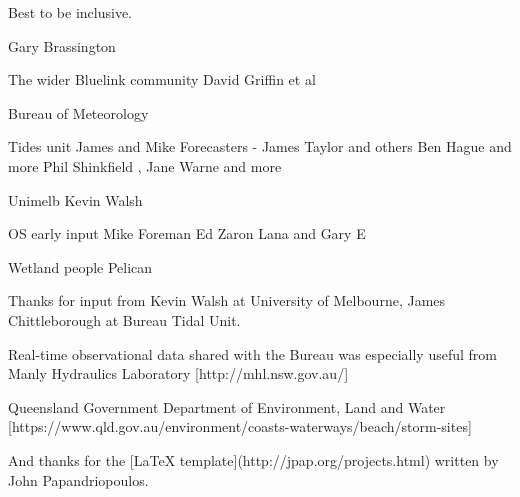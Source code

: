 
\begin{acknowledgements}

    Best to be inclusive.
    
    Gary Brassington
    
    The wider Bluelink community
    David Griffin et al
    
    Bureau of Meteorology
    
    Tides  unit
    James and Mike
    Forecasters - James Taylor and others
    Ben Hague and more
    Phil Shinkfield , Jane Warne and more
    
    Unimelb
    Kevin Walsh

    OS early input
    Mike Foreman
    Ed Zaron
    Lana and Gary E

    Wetland people
    Pelican

Thanks for input from Kevin Walsh at University of Melbourne, James Chittleborough at Bureau Tidal Unit.

Real-time observational data shared with the Bureau was especially useful from Manly Hydraulics Laboratory [http://mhl.nsw.gov.au/] 

Queensland Government Department of Environment, Land and Water [https://www.qld.gov.au/environment/coasts-waterways/beach/storm-sites] 



    And thanks for the [LaTeX template](http://jpap.org/projects.html) written by John Papandriopoulos.
\end{acknowledgements}
